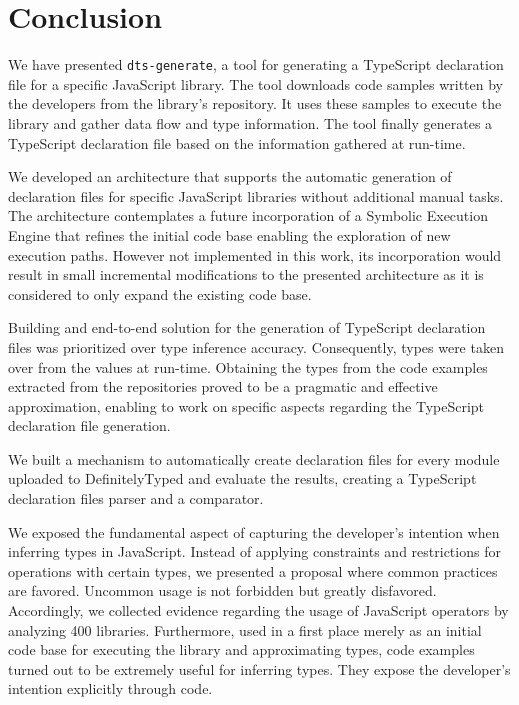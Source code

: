 \chapter{Conclusion}\label{chap:conclusion}

We have presented \texttt{dts-generate}, a tool for generating a TypeScript declaration file for a specific JavaScript library. The tool downloads code samples written by the developers from the library's repository. It uses these samples to execute the library and gather data flow and type information. The tool finally generates a TypeScript declaration file based on the information gathered at run-time.

We developed an architecture that supports the automatic generation of declaration files for specific JavaScript libraries without additional manual tasks. The architecture contemplates a future incorporation of a Symbolic Execution Engine that refines the initial code base enabling the exploration of new execution paths. However not implemented in this work, its incorporation would result in small incremental modifications to the presented architecture as it is considered to only expand the existing code base.

Building and end-to-end solution for the generation of TypeScript declaration files was prioritized over type inference accuracy. Consequently, types were taken over from the values at run-time. Obtaining the types from the code examples extracted from the repositories proved to be a pragmatic and effective approximation, enabling to work on specific aspects regarding the TypeScript declaration file generation.

We built a mechanism to automatically create declaration files for every module uploaded to DefinitelyTyped and evaluate the results, creating a TypeScript declaration files parser and a comparator.

We exposed the fundamental aspect of capturing the developer's intention when inferring types in JavaScript. Instead of applying constraints and restrictions for operations with certain types, we presented a proposal where common practices are favored. Uncommon usage is not forbidden but greatly disfavored. Accordingly, we collected evidence regarding the usage of JavaScript operators by analyzing 400 libraries. Furthermore, used in a first place merely as an initial code base for executing the library and approximating types, code examples turned out to be extremely useful for inferring types. They expose the developer's intention explicitly through code.

